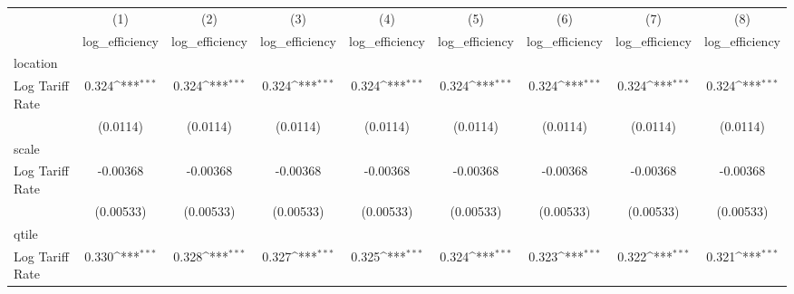 {
\def\sym#1{\ifmmode^{#1}\else\(^{#1}\)\fi}
\begin{tabular}{l*{8}{c}}
\hline\hline
                    &\multicolumn{1}{c}{(1)}&\multicolumn{1}{c}{(2)}&\multicolumn{1}{c}{(3)}&\multicolumn{1}{c}{(4)}&\multicolumn{1}{c}{(5)}&\multicolumn{1}{c}{(6)}&\multicolumn{1}{c}{(7)}&\multicolumn{1}{c}{(8)}\\
                    &\multicolumn{1}{c}{log\_efficiency}&\multicolumn{1}{c}{log\_efficiency}&\multicolumn{1}{c}{log\_efficiency}&\multicolumn{1}{c}{log\_efficiency}&\multicolumn{1}{c}{log\_efficiency}&\multicolumn{1}{c}{log\_efficiency}&\multicolumn{1}{c}{log\_efficiency}&\multicolumn{1}{c}{log\_efficiency}\\
\hline
location            &                     &                     &                     &                     &                     &                     &                     &                     \\
Log Tariff Rate     &       0.324\sym{***}&       0.324\sym{***}&       0.324\sym{***}&       0.324\sym{***}&       0.324\sym{***}&       0.324\sym{***}&       0.324\sym{***}&       0.324\sym{***}\\
                    &    (0.0114)         &    (0.0114)         &    (0.0114)         &    (0.0114)         &    (0.0114)         &    (0.0114)         &    (0.0114)         &    (0.0114)         \\
\hline
scale               &                     &                     &                     &                     &                     &                     &                     &                     \\
Log Tariff Rate     &    -0.00368         &    -0.00368         &    -0.00368         &    -0.00368         &    -0.00368         &    -0.00368         &    -0.00368         &    -0.00368         \\
                    &   (0.00533)         &   (0.00533)         &   (0.00533)         &   (0.00533)         &   (0.00533)         &   (0.00533)         &   (0.00533)         &   (0.00533)         \\
\hline
qtile               &                     &                     &                     &                     &                     &                     &                     &                     \\
Log Tariff Rate     &       0.330\sym{***}&       0.328\sym{***}&       0.327\sym{***}&       0.325\sym{***}&       0.324\sym{***}&       0.323\sym{***}&       0.322\sym{***}&       0.321\sym{***}\\

\end{tabular}}
